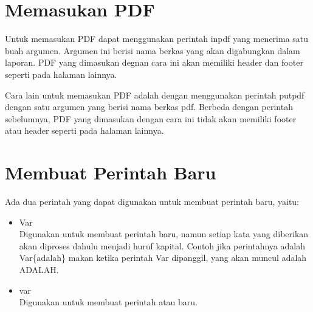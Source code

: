 \section{Memasukan PDF}

Untuk memasukan PDF dapat menggunakan perintah \bslash inpdf yang menerima satu buah argumen. Argumen ini berisi nama berkas yang akan digabungkan dalam laporan. PDF yang dimasukan degnan cara ini akan memiliki header dan footer seperti pada halaman lainnya. 


Cara lain untuk memasukan PDF adalah dengan menggunakan perintah \bslash putpdf dengan satu argumen yang berisi nama berkas pdf. Berbeda dengan perintah sebelumnya, PDF yang dimasukan dengan cara ini tidak akan memiliki footer atau header seperti pada halaman lainnya. 


\section{Membuat Perintah Baru}

Ada dua perintah yang dapat digunakan untuk membuat perintah baru, yaitu: 
\begin{itemize}
	\item \bslash Var \\
		Digunakan untuk membuat perintah baru, namun setiap kata yang diberikan akan diproses dahulu menjadi huruf kapital. Contoh jika perintahnya adalah \bslash Var\{adalah\} makan ketika perintah \bslash Var dipanggil, yang akan muncul adalah ADALAH. 
	\item \bslash var \\
		Digunakan untuk membuat perintah atau baru. 
\end{itemize}